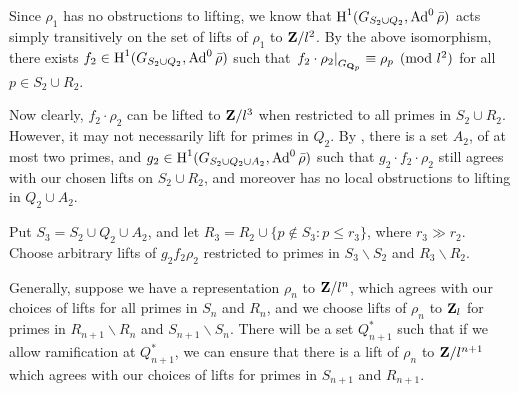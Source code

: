 Since $\rho_1$ has no obstructions to lifting, we know that 
$\operatorname{H}^1(G_{S_2\cup Q_2},\operatorname{Ad}^0\bar\rho)$ acts simply transitively on the set of 
lifts of $\rho_1$ to $\mathbf{Z}/l^2$. By the above isomorphism, there exists 
$f_2\in \operatorname{H}^1(G_{S_2\cup Q_2},\operatorname{Ad}^0\bar\rho)$ such that 
$\left.f_2\cdot \rho_2\right|_{G_{\mathbf{Q}_p}} \equiv \rho_p\pmod{l^2}$ for all 
$p\in S_2\cup R_2$. 

Now clearly, $f_2\cdot \rho_2$ can be lifted to $\mathbf{Z}/l^3$ when restricted to 
all primes in $S_2\cup R_2$. However, it may not necessarily lift for primes in 
$Q_2$. By \cite[Lem.~3.10]{pande-2011}, there is a set $A_2$, of at most 
two primes, and $g_2\in \operatorname{H}^1(G_{S_2\cup Q_2\cup A_2},\operatorname{Ad}^0\bar\rho)$ such that 
$g_2\cdot f_2\cdot \rho_2$ still agrees with our chosen lifts on 
$S_2\cup R_2$, and moreover has no local obstructions to lifting in 
$Q_2\cup A_2$. 

Put $S_3 = S_2\cup Q_2\cup A_2$, and let 
$R_3 = R_2\cup \{p\notin S_3 : p\leqslant r_3\}$, where $r_3\gg r_2$. Choose 
arbitrary lifts of $g_2 f_2 \rho_2$ restricted to primes in 
$S_3\smallsetminus S_2$ and $R_3\smallsetminus R_2$. 

Generally, suppose we have a representation $\rho_n$ to $\mathbf{Z}/l^n$, which 
agrees with our choices of lifts for all primes in $S_n$ and $R_n$, and 
we choose lifts of $\rho_n$ to $\mathbf{Z}_l$ for primes in 
$R_{n+1}\smallsetminus R_n$ and $S_{n+1}\smallsetminus S_n$. There will be a 
set $Q_{n+1}^\ast$ such that if we allow ramification at $Q_{n+1}^\ast$, we can 
ensure that there is a lift of $\rho_n$ to $\mathbf{Z}/l^{n+1}$ which agrees with 
our choices of lifts for primes in $S_{n+1}$ and $R_{n+1}$. 
